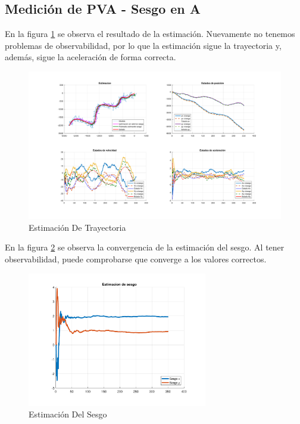 
\subsection{Medición de PVA - Sesgo en A}

	En la figura \ref{fig:ej3f} se observa el resultado de la estimación. Nuevamente no tenemos problemas de observabilidad, por lo que la estimación sigue la trayectoria y, además, sigue la aceleración de forma correcta.

	\begin{figure}[H]
		\centering
		\includegraphics[scale=0.5,trim={6,5cm 0 0 0}]{Figuras/graf_ej4f.pdf}
		\caption{Estimación De Trayectoria}
		\label{fig:ej3f}
	\end{figure}
	
	En la figura \ref{fig:ej3f_bias} se observa la convergencia de la estimación del sesgo. Al tener observabilidad, puede comprobarse que converge a los valores correctos.
	
	\begin{figure}[H]
		\centering
		\includegraphics[width=0.7\textwidth,keepaspectratio]{Figuras/bias_ej4f.pdf}
		\caption{Estimación Del Sesgo}
		\label{fig:ej3f_bias}
	\end{figure}
	
